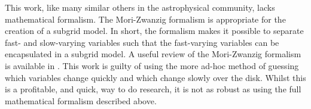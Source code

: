 This work, like many similar others in the astrophysical community, lacks mathematical formalism.
The Mori-Zwanzig formalism \citep{ zwanzig_memory_1961, zwanzig_nonequilibrium_2001} is appropriate for the creation of a subgrid model.
In short, the formalism makes it possible to separate fast- and slow-varying variables such that the fast-varying variables can be encapsulated in a subgrid model.
A useful review of the Mori-Zwanzig formalism is available in \citet{xing_mori-zwanzig_2009}.
This work is guilty of using the more ad-hoc method of guessing which variables change quickly and which change slowly over the disk.
Whilst this is a profitable, and quick, way to do research, it is not as robust as using the full mathematical formalism described above.
